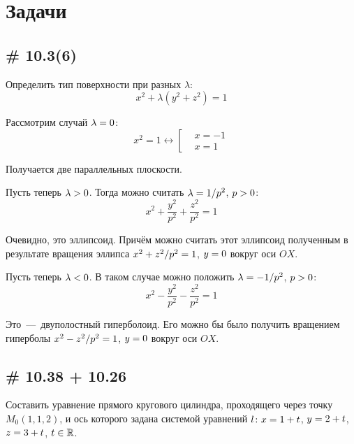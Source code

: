 \documentclass[a4paper,12pt]{article}
\begin{document}
  
  \section{Задачи}
  
  \subsection{\# 10.3(6)}
  
  Определить тип поверхности при разных $\lambda$:
  \[
    x^2 + \lambda (y^2 + z^2) = 1
  \]
  
  \begin{solution}
    Рассмотрим случай $\lambda \hm= 0$:
    \[
      x^2 = 1 \leftrightarrow \left[
        \begin{aligned}
          &x = -1\\
          &x = 1
        \end{aligned}
      \right.
    \]
    
    Получается две параллельных плоскости.
    
    \medskip
    
    Пусть теперь $\lambda \hm> 0$.
    Тогда можно считать $\lambda \hm= 1/p^2$, $p \hm> 0$:
    \[
      x^2 + \frac{y^2}{p^2} + \frac{z^2}{p^2} = 1
    \]
    
    Очевидно, это эллипсоид.
    Причём можно считать этот эллипсоид полученным в результате вращения эллипса $x^2 \hm+ z^2/p^2 \hm= 1$, $y \hm= 0$ вокруг оси $OX$. 
    
    \medskip
    
    Пусть теперь $\lambda \hm< 0$.
    В таком случае можно положить $\lambda \hm= -1/p^2$, $p \hm> 0$:
    \[
      x^2 - \frac{y^2}{p^2} - \frac{z^2}{p^2} = 1
    \]
    
    Это~---~двуполостный гиперболоид.
    Его можно бы было получить вращением гиперболы $x^2 \hm- z^2/p^2 \hm= 1$, $y \hm= 0$ вокруг оси $OX$.
  \end{solution}
  
  
  \subsection{\# 10.38 + 10.26}
  
  Составить уравнение прямого кругового цилиндра, проходящего через точку $M_0(1, 1, 2)$, и ось которого задана системой уравнений $l\colon x \hm= 1 \hm+ t$, $y \hm= 2 \hm+ t$, $z \hm= 3 \hm+ t$, $t \hm\in \RR$.
  
\end{document}
